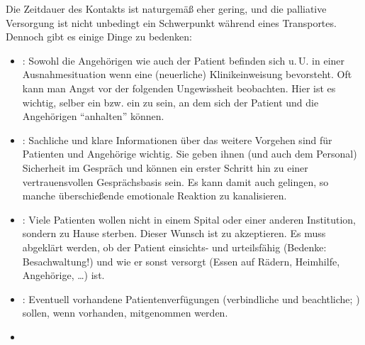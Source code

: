  {Die Zeitdauer des
Kontakts ist naturgemäß eher gering, und die palliative
Versorgung ist nicht unbedingt ein Schwerpunkt während eines
Transportes.  Dennoch gibt es einige Dinge zu bedenken:

\begin{itemize}
  \item {}: Sowohl die Angehörigen wie
  auch der Patient befinden sich u.\,U. in einer
  Ausnahmesituation wenn eine (neuerliche) Klinikeinweisung
  bevorsteht. Oft kann man Angst vor der folgenden
  Ungewissheit beobachten. Hier ist es wichtig,
  selber ein  bzw. ein 
  zu sein, an dem sich der Patient und die Angehörigen
  \enquote{anhalten} können.
  \item {}: Sachliche und klare Informationen
  über das weitere Vorgehen sind für Patienten und
  Angehörige wichtig. Sie geben ihnen (und auch dem
  Personal) Sicherheit im Gespräch und können ein erster
  Schritt hin zu einer vertrauensvollen
  Gesprächsbasis sein. Es kann damit auch gelingen, so
  manche überschießende emotionale Reaktion zu kanalisieren.
  \item {}: Viele Patienten wollen
  nicht in einem Spital oder einer anderen Institution,
  sondern zu Hause sterben. Dieser Wunsch ist zu akzeptieren.
  Es muss abgeklärt werden, ob der Patient einsichts-
  und urteilsfähig (Bedenke: Besachwaltung!) und wie er sonst
  versorgt (Essen auf Rädern, Heimhilfe, Angehörige, \ldots) ist.
  \item {}: Eventuell vorhandene
  Patientenverfügungen (verbindliche und beachtliche;
  ) sollen, wenn
  vorhanden, mitgenommen werden.
  \item {}
\end{itemize}
}
{}
{}
{}
{}






